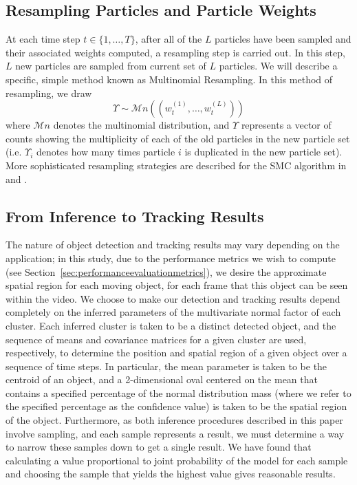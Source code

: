 \documentclass[twocolumn, final]{svjour3}
\begin{document}


\subsection{Resampling Particles and Particle Weights}
\label{sec:resample}

At each time step $t \in \{ 1, \ldots, T \}$, after all of the $L$ particles have been sampled and their associated weights computed, a resampling step is carried out. In this step, $L$ new particles are sampled from current set of $L$ particles. We will describe a specific, simple method known as Multinomial Resampling. In this method of resampling, we draw
\begin{equation}
\Upsilon \sim \mathcal{M}n((w_{t}^{(1)}, \ldots, w_{t}^{(L)}))
\end{equation}
where $\mathcal{M}n$ denotes the multinomial distribution, and $\Upsilon$ represents a vector of counts showing the multiplicity of each of the old particles in the new particle set (i.e. $\Upsilon_{i}$ denotes how many times particle $i$ is duplicated in the new particle set). More sophisticated resampling strategies are described for the SMC algorithm in \cite{gasthaus_thesis} and \cite{douc2005comparison}.


\subsection{From Inference to Tracking Results}
\label{sec:inferencetotrackingresults}

The nature of object detection and tracking results may vary depending on the application; in this study, due to the performance metrics we wish to compute (see Section~\ref{sec:performanceevaluationmetrics}), we desire the approximate spatial region for each moving object, for each frame that this object can be seen within the video. We choose to make our detection and tracking results depend completely on the inferred parameters of the multivariate normal factor of each cluster. Each inferred cluster is taken to be a distinct detected object, and the sequence of means and covariance matrices for a given cluster are used, respectively, to determine the position and spatial region of a given object over a sequence of time steps. In particular, the mean parameter is taken to be the centroid of an object, and a 2-dimensional oval centered on the mean that contains a specified percentage of the normal distribution mass (where we refer to the specified percentage as the confidence value) is taken to be the spatial region of the object. Furthermore, as both inference procedures described in this paper involve sampling, and each sample represents a result, we must determine a way to narrow these samples down to get a single result. We have found that calculating a value proportional to joint probability of the model for each sample and choosing the sample that yields the highest value gives reasonable results.
\end{document}
